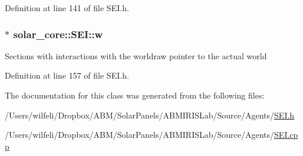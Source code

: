 Definition at line 141 of file S\+E\+I.\+h.

\hypertarget{classsolar__core_1_1_s_e_i_a82e0c6b5f6d83639a08c1bc357fd3466}{}
\subsubsection[{w}]{$\ast$ solar\+\_\+core\+::\+S\+E\+I\+::w\hspace{0.3cm}{\ttfamily [protected]}}\label{classsolar__core_1_1_s_e_i_a82e0c6b5f6d83639a08c1bc357fd3466}
Sections with interactions with the worldraw pointer to the actual world 

Definition at line 157 of file S\+E\+I.\+h.



The documentation for this class was generated from the following files\+:\begin{DoxyCompactItemize}
\item 
/\+Users/wilfeli/\+Dropbox/\+A\+B\+M/\+Solar\+Panels/\+A\+B\+M\+I\+R\+I\+S\+Lab/\+Source/\+Agents/\hyperlink{_s_e_i_8h}{S\+E\+I.\+h}\item 
/\+Users/wilfeli/\+Dropbox/\+A\+B\+M/\+Solar\+Panels/\+A\+B\+M\+I\+R\+I\+S\+Lab/\+Source/\+Agents/\hyperlink{_s_e_i_8cpp}{S\+E\+I.\+cpp}\end{DoxyCompactItemize}
